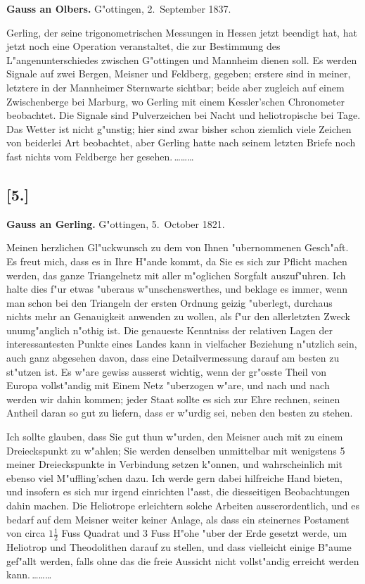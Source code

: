 \documentclass[12pt,a4paper]{article}
\theoremstyle{plain}
\theoremstyle{definition}
\theoremstyle{remark}
\begin{document}
\medskip
\noindent \textbf{Gauss an Olbers.} G"ottingen, 2.~September 1837.

\medskip
\noindent Gerling, der seine trigonometrischen Messungen in Hessen jetzt beendigt hat, hat jetzt noch eine Operation veranstaltet, die zur Bestimmung des L"angenunterschiedes zwischen G"ottingen und Mannheim dienen soll. Es werden Signale auf zwei Bergen, Meisner und Feldberg, gegeben; erstere sind in meiner, letztere in der Mannheimer Sternwarte sichtbar; beide aber zugleich auf einem Zwischenberge bei Marburg, wo Gerling mit einem Kessler'schen Chronometer beobachtet. Die Signale sind Pulverzeichen bei Nacht und heliotropische bei Tage. Das Wetter ist nicht g"unstig; hier sind zwar bisher schon ziemlich viele Zeichen von beiderlei Art beobachtet, aber Gerling hatte nach seinem letzten Briefe noch fast nichts vom Feldberge her gesehen.\,\ldots\ldots\ldots

\newpage
\subsection*{[5.]}

\noindent \textbf{Gauss an Gerling.} G"ottingen, 5.~October 1821.

\medskip
\noindent Meinen herzlichen Gl"uckwunsch zu dem von Ihnen "ubernommenen Gesch"aft. Es freut mich, dass es in Ihre H"ande kommt, da Sie es sich zur Pflicht machen werden, das ganze Triangelnetz mit aller m"oglichen Sorgfalt auszuf"uhren. Ich halte dies f"ur etwas "uberaus w"unschenswerthes, und beklage es immer, wenn man schon bei den Triangeln der ersten Ordnung geizig "uberlegt, durchaus nichts mehr an Genauigkeit anwenden zu wollen, als f"ur den allerletzten Zweck unumg"anglich n"othig ist. Die genaueste Kenntniss der relativen Lagen der interessantesten Punkte eines Landes kann in vielfacher Beziehung n"utzlich sein, auch ganz abgesehen davon, dass eine Detailvermessung darauf am besten zu st"utzen ist. Es w"are gewiss ausserst wichtig, wenn der gr"osste Theil von Europa vollst"andig mit Einem Netz "uberzogen w"are, und nach und nach werden wir dahin kommen; jeder Staat sollte es sich zur Ehre rechnen, seinen Antheil daran so gut zu liefern, dass er w"urdig sei, neben den besten zu stehen.

Ich sollte glauben, dass Sie gut thun w"urden, den Meisner auch mit zu einem Dreieckspunkt zu w"ahlen; Sie werden denselben unmittelbar mit wenigstens 5 meiner Dreieckspunkte in Verbindung setzen k"onnen, und wahrscheinlich mit ebenso viel M"uffling'schen dazu. Ich werde gern dabei hilfreiche Hand bieten, und insofern es sich nur irgend einrichten l"asst, die diesseitigen Beobachtungen dahin machen. Die Heliotrope erleichtern solche Arbeiten ausserordentlich, und es bedarf auf dem Meisner weiter keiner Anlage, als dass ein steinernes Postament von circa $1\frac{1}{2}$ Fuss Quadrat und 3 Fuss H"ohe "uber der Erde gesetzt werde, um Heliotrop und Theodolithen darauf zu stellen, und dass vielleicht einige B"aume gef"allt werden, falls ohne das die freie Aussicht nicht vollst"andig erreicht werden kann.\,\ldots\ldots\ldots
\end{document}
